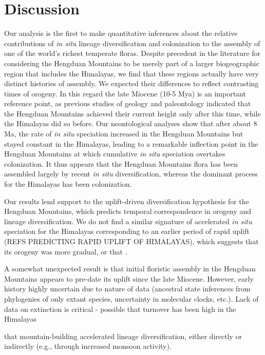 \section{Discussion}

Our analysis is the first to make quantitative inferences about the relative contributions of \textit{in situ} lineage diversification and colonization to the assembly of one of the world's richest temperate floras. Despite precedent in the literature for considering the Hengduan Mountains to be merely part of a larger biogeographic region that includes the Himalayas, we find that these regions actually have very distinct histories of assembly. We expected their differences to reflect contrasting times of orogeny. In this regard the late Miocene (10-5 Mya) is an important reference point, as previous studies of geology and paleontology indicated that the Hengduan Mountains achieved their current height only after this time, while the Himalayas did so before. Our neontological analyses show that after about 8 Ma, the rate of \textit{in situ} speciation increased in the Hengduan Mountains but stayed constant in the Himalayas, leading to a remarkable inflection point in the Hengduan Mountains at which cumulative \textit{in situ} speciation overtakes colonization. It thus appears that the Hengduan Mountains flora has been assembled largely by recent \textit{in situ} diversification, whereas the dominant process for the Himalayas has been colonization.

Our results lend support to the uplift-driven diversification hypothesis for the Hengduan Mountains, which predicts temporal correspondence in orogeny and lineage diversification. We do not find a similar signature of accelerated \textit{in situ} speciation for the Himalayas corresponding to an earlier period of rapid uplift (REFS PREDICTING RAPID UPLIFT OF HIMALAYAS), which suggests that its orogeny was more gradual, or that .

A somewhat unexpected result is that initial floristic assembly in the Hengduan Mountains appears to pre-date its uplift since the late Miocene. However, early history highly uncertain due to nature of data (ancestral state inferences from phylogenies of only extant species, uncertainty in molecular clocks, etc.). Lack of data on extinction is critical - possible that turnover has been high in the Himalayas

that mountain-building accelerated lineage diversification, either directly or indirectly (e.g., through increased monsoon activity).



